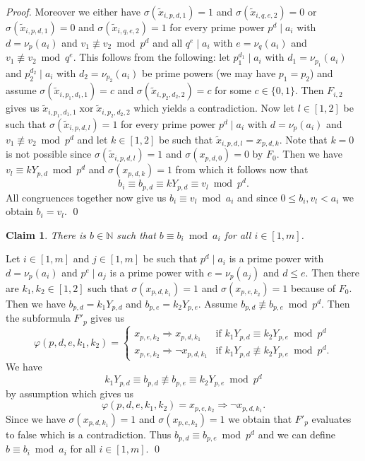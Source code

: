 \documentclass{article}
\newtheorem{claim}{Claim}
\DeclareMathOperator{\xor}{xor}
\begin{document}
\begin{proof}
Moreover we either have $\sigma(\tilde{x}_{i,p,d,1}) = 1$ and $\sigma(\tilde{x}_{i,q,e,2}) = 0$ or $\sigma(\tilde{x}_{i,p,d,1}) = 0$ and $\sigma(\tilde{x}_{i,q,e,2}) = 1$ for every prime power $p^d \mid a_i$ with $d = \nu_p(a_i)$ and $v_1 \not \equiv v_2 \bmod p^d$ and all $q^e \mid a_i$ with $e = \nu_q(a_i)$ and $v_1 \not \equiv v_2 \bmod q^e$. This follows from the following: let $p_1^{d_1} \mid a_i$ with $d_1 = \nu_{p_1}(a_i)$ and $p_2^{d_2} \mid a_i$ with $d_2 = \nu_{p_2}(a_i)$ be prime powers (we may have $p_1 = p_2$) and assume $\sigma(\tilde{x}_{i,p_1,d_1,1}) = c$ and $\sigma(\tilde{x}_{i,p_2,d_2,2}) = c$ for some $c \in \{0,1\}$. Then $F_{i,2}$ gives us $\tilde{x}_{i,p_1,d_1,1} \xor \tilde{x}_{i,p_2,d_2,2}$ which yields a contradiction. Now let $l \in [1,2]$ be such that $\sigma(\tilde{x}_{i,p,d,l}) = 1$ for every prime power $p^d \mid a_i$ with $d = \nu_p(a_i)$ and $v_1 \not \equiv v_2 \bmod p^d$ and let $k \in [1,2]$ be such that $\tilde{x}_{i,p,d,l} = x_{p,d,k}$. Note that $k=0$ is not possible since $\sigma(\tilde{x}_{i,p,d,l}) = 1$ and $\sigma(x_{p,d,0}) = 0$ by $F_0$. Then we have $v_l \equiv kY_{p,d} \bmod p^d$ and $\sigma(x_{p,d,k}) = 1$ from which it follows now that
\begin{displaymath}
b_i \equiv b_{p,d} \equiv kY_{p,d} \equiv v_l \bmod p^d.
\end{displaymath}
All congruences together now give us $b_i \equiv v_l \bmod a_i$ and since $0 \leq b_i,v_l < a_i$ we obtain $b_i = v_l$.
\qed
\begin{claim}\label{claimbequivbiai}
There is $b \in \mathbb{N}$ such that $b \equiv b_i \bmod a_i$ for all $i \in [1,m]$.
\end{claim}
Let $i \in [1,m]$ and $j \in [1,m]$ be such that $p^d \mid a_i$ is a prime power with $d = \nu_p(a_i)$ and $p^e \mid a_j$ is a prime power with $e = \nu_p(a_j)$ and $d \leq e$. Then there are $k_1,k_2 \in [1,2]$ such that $\sigma(x_{p,d,k_1}) = 1$ and $\sigma(x_{p,e,k_2}) = 1$ because of $F_0$. Then we have $b_{p,d} = k_1Y_{p,d}$ and $b_{p,e} = k_2Y_{p,e}$. Assume $b_{p,d} \not \equiv b_{p,e} \bmod p^d$. Then the subformula $F'_p$ gives us
\begin{displaymath}
\varphi(p,d,e,k_1,k_2) = \begin{cases}
x_{p,e,k_2} \Rightarrow x_{p,d,k_1} & \text{if } k_1Y_{p,d} \equiv k_2Y_{p,e} \bmod p^d\\
x_{p,e,k_2} \Rightarrow \neg x_{p,d,k_1} & \text{if } k_1Y_{p,d} \not \equiv k_2Y_{p,e} \bmod p^d.
\end{cases}
\end{displaymath}
We have
\begin{displaymath}
k_1Y_{p,d} \equiv b_{p,d} \not \equiv b_{p,e} \equiv k_2Y_{p,e} \bmod p^d
\end{displaymath}
by assumption which gives us
\begin{displaymath}
\varphi(p,d,e,k_1,k_2) = x_{p,e,k_2} \Rightarrow \neg x_{p,d,k_1}.
\end{displaymath}
Since we have $\sigma(x_{p,d,k_1}) = 1$ and $\sigma(x_{p,e,k_2}) = 1$ we obtain that $F'_p$ evaluates to false which is a contradiction. Thus $b_{p,d} \equiv b_{p,e} \bmod p^d$ and we can define $b \equiv b_i \bmod a_i$ for all $i \in [1,m]$.
\qed


\end{proof}
\end{document}
